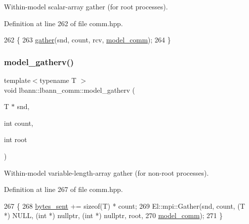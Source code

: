 Within-\/model scalar-\/array gather (for root processes). 

Definition at line 262 of file comm.\+hpp.


\begin{DoxyCode}
262                                                \{
263     \hyperlink{classlbann_1_1lbann__comm_aa784298e6ed0f9f01a20b179d5110df9}{gather}(snd, count, rcv, \hyperlink{classlbann_1_1lbann__comm_a58a75b76bd61ec8a26c1cbbec3dc2f45}{model\_comm});
264   \}
\end{DoxyCode}
\mbox{\label{classlbann_1_1lbann__comm_a9d4eeae3b7ed19d48e95fc3f7138885b}} 
\subsubsection{\texorpdfstring{model\+\_\+gatherv()}{model\_gatherv()}\hspace{0.1cm}{\footnotesize\ttfamily [1/2]}}
{\footnotesize\ttfamily template$<$typename T $>$ \\
void lbann\+::lbann\+\_\+comm\+::model\+\_\+gatherv (\begin{DoxyParamCaption}\item[{T $\ast$}]{snd,  }\item[{int}]{count,  }\item[{int}]{root }\end{DoxyParamCaption})\hspace{0.3cm}{\ttfamily [inline]}}

Within-\/model variable-\/length-\/array gather (for non-\/root processes). 

Definition at line 267 of file comm.\+hpp.


\begin{DoxyCode}
267                                                   \{
268     \hyperlink{classlbann_1_1lbann__comm_ad1f146ae7337ece6266fd307944928e0}{bytes\_sent} += \textcolor{keyword}{sizeof}(T) * count;
269     El::mpi::Gather(snd, count, (T *) NULL, (\textcolor{keywordtype}{int} *) \textcolor{keyword}{nullptr}, (\textcolor{keywordtype}{int} *) \textcolor{keyword}{nullptr}, root,
270                     \hyperlink{classlbann_1_1lbann__comm_a58a75b76bd61ec8a26c1cbbec3dc2f45}{model\_comm});
271   \}
\end{DoxyCode}
\mbox{\label{classlbann_1_1lbann__comm_a2752b91d60548d15320d5808d8c523d2}} 
